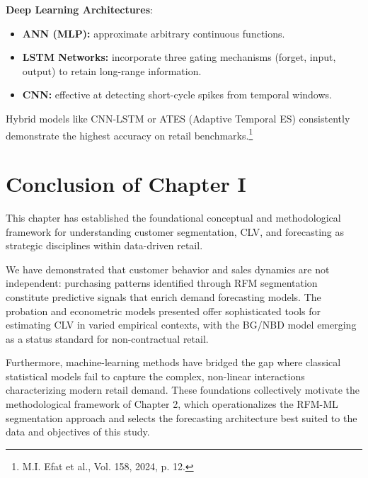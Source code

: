 \documentclass[12pt,a4paper,oneside]{report}
\begin{document}
\textbf{Deep Learning Architectures}:
\begin{itemize}
    \item \textbf{ANN (MLP):} approximate arbitrary continuous functions.
    \item \textbf{LSTM Networks:} incorporate three gating mechanisms (forget, input, output) to retain long-range information.
    \item \textbf{CNN:} effective at detecting short-cycle spikes from temporal windows.
\end{itemize}

Hybrid models like CNN-LSTM or ATES (Adaptive Temporal ES) consistently demonstrate the highest accuracy on retail benchmarks.\footnote{M.I. Efat et al., Vol. 158, 2024, p. 12.}

\section*{Conclusion of Chapter I}

This chapter has established the foundational conceptual and methodological framework for understanding customer segmentation, CLV, and forecasting as strategic disciplines within data-driven retail.

We have demonstrated that customer behavior and sales dynamics are not independent: purchasing patterns identified through RFM segmentation constitute predictive signals that enrich demand forecasting models. The probation and econometric models presented offer sophisticated tools for estimating CLV in varied empirical contexts, with the BG/NBD model emerging as a status standard for non-contractual retail.

Furthermore, machine-learning methods have bridged the gap where classical statistical models fail to capture the complex, non-linear interactions characterizing modern retail demand. These foundations collectively motivate the methodological framework of Chapter 2, which operationalizes the RFM-ML segmentation approach and selects the forecasting architecture best suited to the data and objectives of this study.

\clearpage
\end{document}
